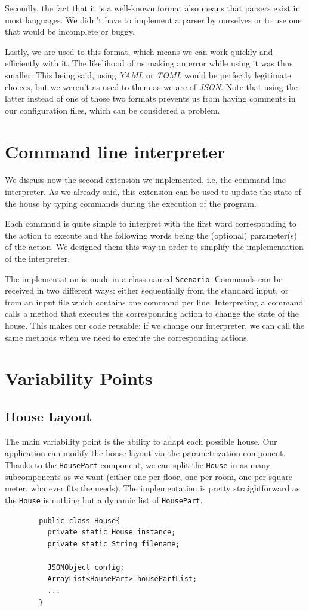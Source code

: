 		Secondly, the fact that it is a well-known format also means that parsers exist in most languages. We didn't have to implement a parser by ourselves or to use one that would be incomplete or buggy.

		Lastly, we are used to this format, which means we can work quickly and efficiently with it. The likelihood of us making an error while using it was thus smaller. This being said, using \textit{YAML} or \textit{TOML} would be perfectly legitimate choices, but we weren't as used to them as we are of \textit{JSON}. Note that using the latter instead of one of those two formats prevents us from having comments in our configuration files, which can be considered a problem.
	
	\section{Command line interpreter}
		We discuss now the second extension we implemented, i.e. the command line interpreter. As we already said, this extension can be used to update the state of the house by typing commands during the execution of the program.
		
		Each command is quite simple to interpret with the first word corresponding to the action to execute and the following words being the (optional) parameter(s) of the action. We designed them this way in order to simplify the implementation of the interpreter.
		
		The implementation is made in a class named \texttt{Scenario}. Commands can be received in two different ways: either sequentially from the standard input, or from an input file which contains one command per line. Interpreting a command calls a method that executes the corresponding action to change the state of the house. This makes our code reusable: if we change our interpreter, we can call the same methods when we need to execute the corresponding actions.

  \section{Variability Points}
    \subsection{House Layout}
      The main variability point is the ability to adapt each possible house. Our application can modify the house layout via the parametrization component. Thanks to the \texttt{HousePart} component, we can split the \texttt{House} in as many subcomponents as we want (either one per floor, one per room, one per square meter, whatever fits the needs). The implementation is pretty straightforward as the \texttt{House} is nothing but a dynamic list of \texttt{HousePart}.
      \begin{verbatim}
        public class House{
          private static House instance;
          private static String filename;

          JSONObject config;
          ArrayList<HousePart> housePartList;
          ...
        }
      \end{verbatim}

